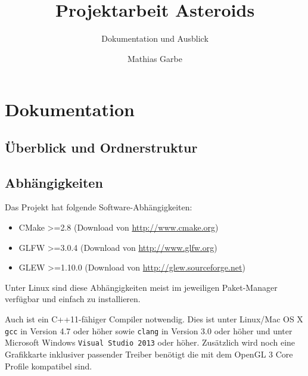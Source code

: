 \documentclass[12pt, a4paper, titlepage, hidelinks]{scrreprt}
\title{Projektarbeit Asteroids}
\subtitle{Dokumentation und Ausblick}
\author{Mathias Garbe}
\begin{document}
\maketitle

\tableofcontents
{}

\clearpage


\chapter{Dokumentation}



\section{Überblick und Ordnerstruktur}


\section{Abhängigkeiten}

Das Projekt hat folgende Software-Abhängigkeiten:
\begin{itemize}
  \item CMake >=2.8 (Download von \url{http://www.cmake.org})
  \item GLFW >=3.0.4 (Download von \url{http://www.glfw.org})
  \item GLEW >=1.10.0 (Download von \url{http://glew.sourceforge.net})
\end{itemize}

Unter Linux sind diese Abhängigkeiten meist im jeweiligen Paket-Manager verfügbar und einfach zu installieren.

Auch ist ein C++11-fähiger Compiler notwendig. Dies ist unter Linux/Mac OS X \texttt{gcc} in Version 4.7 oder höher sowie \texttt{clang} in Version 3.0 oder höher und unter Microsoft Windows \texttt{Visual Studio 2013} oder höher. Zusätzlich wird noch eine Grafikkarte inklusiver passender Treiber benötigt die mit dem OpenGL 3 Core Profile kompatibel sind.
\end{document}
